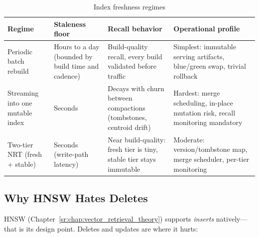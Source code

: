 \begin{table}[H]
\centering
\small
\caption{Index freshness regimes}
\label{sr:tab:freshness_regimes}
\begin{tabularx}{\textwidth}{lXXX}
\toprule
\textbf{Regime} & \textbf{Staleness floor} & \textbf{Recall behavior} & \textbf{Operational profile} \\
\midrule
Periodic batch rebuild & Hours to a day (bounded by build time and cadence) & Build-quality recall, every build validated before traffic & Simplest: immutable serving artifacts, blue/green swap, trivial rollback \\
Streaming into one mutable index & Seconds & Decays with churn between compactions (tombstones, centroid drift) & Hardest: merge scheduling, in-place mutation risk, recall monitoring mandatory \\
Two-tier NRT (fresh + stable) & Seconds (write-path latency) & Near build-quality: fresh tier is tiny, stable tier stays immutable & Moderate: version/tombstone map, merge scheduler, per-tier monitoring \\
\bottomrule
\end{tabularx}
\end{table}

\subsection{Why HNSW Hates Deletes}

HNSW (Chapter~\ref{sr:chap:vector_retrieval_theory}) supports \textit{inserts} natively---that is its design point. Deletes and updates are where it hurts:

